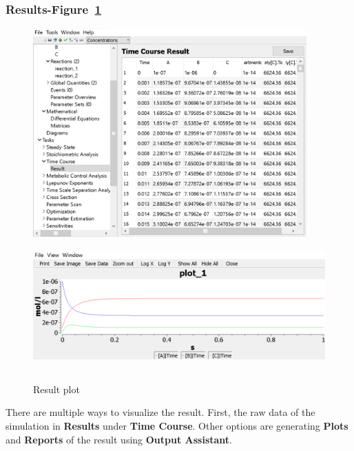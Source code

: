 \documentclass[10pt]{article}
\theoremstyle{definition}
\theoremstyle{remark}
\begin{document}
	\subsubsection*{Results-Figure~\ref{Result1}}			\begin{figure}[!htb]
	\centering
	\includegraphics[height=8cm]{Images/R1a.png}		
	\includegraphics[height=5cm]{Images/R1b.png}
	\caption{Result plot}
	\label{Result1}
	\end{figure}
	There are multiple ways to visualize the result. First,  the raw data of the simulation in \textbf{Results} under \textbf{Time Course}. Other options are generating \textbf{Plots} and \textbf{Reports} of the result using \textbf{Output Assistant}. 
	
\end{document}
